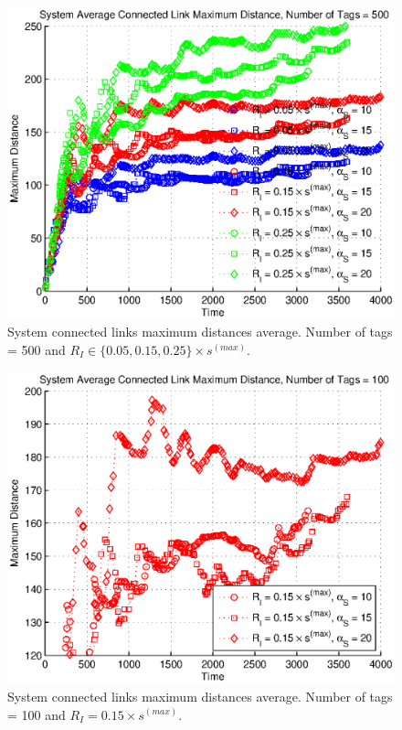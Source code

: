 \begin{figure}
\centering
\includegraphics[width=5in]{Chapter_4_Figures/sys_links_max_dist_500tags_all.eps}
\caption{System connected links maximum distances average. Number of tags = 500 and $R_I \in \{0.05, 0.15, 0.25\} \times s^{(max)}$.}
\label{Figure: sys_links_max_dist_500tags_all.eps}
\end{figure}
\begin{figure}
\centering
\includegraphics[width=5in]{Chapter_4_Figures/sys_links_max_dist_100tags_15diam.eps}
\caption{System connected links maximum distances average. Number of tags = 100 and $R_I = 0.15 \times s^{(max)}$.}
\label{Figure: sys_links_max_dist_100tags_15diam.eps}
\end{figure}
\clearpage

